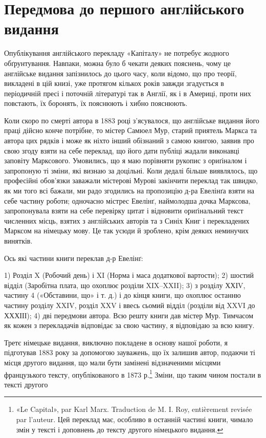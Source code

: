 \section*{Передмова до першого англійського видання
}

Опублікування англійського перекладу «Капіталу» не потребує жодного
обґрунтування. Навпаки, можна було б чекати деяких пояснень, чому це
англійське видання запізнилось до цього часу, коли відомо, що про теорії,
викладені в цій книзі, уже протягом кількох років завжди згадується в
періодичній пресі і поточній літературі так в Англії, як і в Америці,
проти них повстають, їх боронять, їх пояснюють і хибно пояснюють.

Коли скоро по смерті автора в 1883 році з’ясувалося, що англійське
видання його праці дійсно конче потрібне, то містер Самюел
Мур, старий приятель Маркса та автора цих рядків і може
як ніхто інший обізнаний з самою книгою, заявив про свою згоду
взяти на себе переклад, що його дати публіці жадали виконавці
заповіту Марксового. Умовились, що я маю порівняти рукопис з
ориґіналом і запропоную ті зміни, які визнаю за доцільні. Коли
дедалі більше виявлялось, що професійні обов’язки заважали
містерові Мурові закінчити переклад так швидко, як ми того всі
бажали, ми радо згодились на пропозицію д-ра Евелінґа взяти
на себе частину роботи; одночасно містрес Евелінґ, наймолодша
дочка Марксова, запропонувала взяти на себе перевірку цитат і
відновити ориґінальний текст численних місць, взятих з англійських
авторів та з Синіх Книг і перекладених Марксом на німецьку
мову. Це так усюди й зроблено, крім деяких неминучих винятків.

Ось які частини книги переклав д-р Евелінґ:

1) Розділ X (Робочий день) і XI (Норма і маса додаткової
вартости); 2) шостий відділ (Заробітна плата, що охоплює розділи
XIX--XXII); 3) з розділу ХХІV, частину 4 («Обставини, що»
і т. д.) і до кінця книги, що охоплює останню частину розділу
XXIV, розділ XXV і ввесь сьомий відділ (розділи від XXVI
до ХХХІІІ); 4) дві передмови автора. Всю решту книги дав містер
Мур. Тимчасом як кожен з перекладачів відповідає за свою
частину, я відповідаю за всю книгу.

Третє німецьке видання, виключно покладене в основу нашої
роботи, я підготував 1883 року за допомогою зауважень, що їх
залишив автор, подаючи ті місця другого видання, що мали бути
замінені відзначеними місцями французького тексту, опублікованого
в 1873 р.\footnote*{
«Le Capital», par Karl Marx. Traduction de M. I. Roy, entièrement
revisée par l’auteur. Цей переклад має, особливо в останній частині книги,
чимало змін у тексті і доповнень до тексту другого німецького видання.
} Зміни, що таким чином постали в тексті другого
\parbreak{}  %
